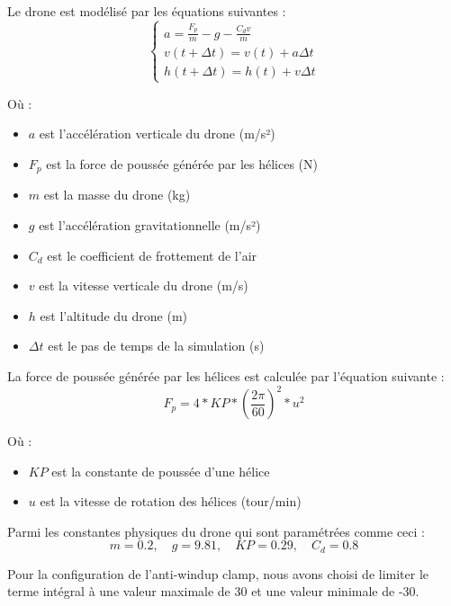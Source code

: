 Le drone est modélisé par les équations suivantes :
\begin{equation}
\begin{cases}
    a = \frac{F_{p}}{m} - g - \frac{C_{d}v}{m} \\
    v(t + \Delta t) = v(t) + a \Delta t \\
    h(t + \Delta t) = h(t) + v \Delta t
\end{cases}
\end{equation}

Où : 
\begin{itemize}
    \item $a$ est l'accélération verticale du drone (m/s²)
    \item $F_{p}$ est la force de poussée générée par les hélices (N)
    \item $m$ est la masse du drone (kg)
    \item $g$ est l'accélération gravitationnelle (m/s²)
    \item $C_{d}$ est le coefficient de frottement de l'air
    \item $v$ est la vitesse verticale du drone (m/s)
    \item $h$ est l'altitude du drone (m)
    \item $\Delta t$ est le pas de temps de la simulation (s) 
\end{itemize}

La force de poussée générée par les hélices est calculée par l'équation suivante :
\begin{equation}
F_{p} = 4 * KP * \left(\frac{2 \pi}{60}\right)^{2} * u^{2}
\end{equation}

Où :
\begin{itemize}
    \item $KP$ est la constante de poussée d'une hélice
    \item $u$ est la vitesse de rotation des hélices (tour/min)
\end{itemize}

Parmi les constantes physiques du drone qui sont paramétrées comme ceci :
\begin{equation}
    m = 0{.}2, \quad g = 9{.}81, \quad KP = 0.29, \quad C_{d} = 0{.}8
\end{equation}

Pour la configuration de l'anti-windup clamp, nous avons choisi de limiter le terme intégral à une valeur maximale de 30 et une valeur minimale de -30. \\

